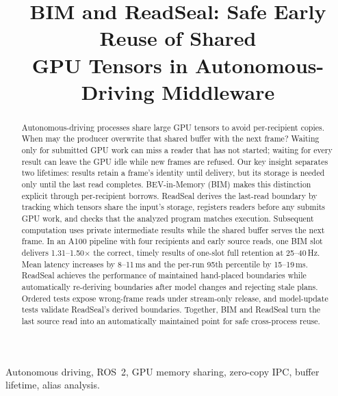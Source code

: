 \documentclass[conference]{IEEEtran}
\newcommand{\ms}{\,ms}
\newcommand{\Hz}{\,Hz}
\begin{document}
\title{BIM and ReadSeal: Safe Early Reuse of Shared\\ GPU Tensors in Autonomous-Driving Middleware}

\author{
}

\maketitle

\begin{abstract}
Autonomous-driving processes share large GPU tensors to avoid per-recipient copies. When may the producer overwrite that shared buffer with the next frame? Waiting only for submitted GPU work can miss a reader that has not started; waiting for every result can leave the GPU idle while new frames are refused. Our key insight separates two lifetimes: results retain a frame's identity until delivery, but its storage is needed only until the last read completes. BEV-in-Memory (BIM) makes this distinction explicit through per-recipient borrows. ReadSeal derives the last-read boundary by tracking which tensors share the input's storage, registers readers before any submits GPU work, and checks that the analyzed program matches execution. Subsequent computation uses private intermediate results while the shared buffer serves the next frame. In an A100 pipeline with four recipients and early source reads, one BIM slot delivers 1.31--1.50$\times$ the correct, timely results of one-slot full retention at 25--40\Hz. Mean latency increases by 8--11\ms{} and the per-run 95th percentile by 15--19\ms. ReadSeal achieves the performance of maintained hand-placed boundaries while automatically re-deriving boundaries after model changes and rejecting stale plans. Ordered tests expose wrong-frame reads under stream-only release, and model-update tests validate ReadSeal's derived boundaries. Together, BIM and ReadSeal turn the last source read into an automatically maintained point for safe cross-process reuse.
\end{abstract}

\begin{IEEEkeywords}
Autonomous driving, ROS~2, GPU memory sharing, zero-copy IPC, buffer lifetime, alias analysis.
\end{IEEEkeywords}
\end{document}
